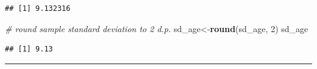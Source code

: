\documentclass[
]{article}
\newenvironment{Shaded}{\begin{snugshade}}{\end{snugshade}}
\newcommand{\CommentTok}[1]{\textcolor[rgb]{0.56,0.35,0.01}{\textit{#1}}}
\newcommand{\DecValTok}[1]{\textcolor[rgb]{0.00,0.00,0.81}{#1}}
\newcommand{\FunctionTok}[1]{\textcolor[rgb]{0.13,0.29,0.53}{\textbf{#1}}}
\newcommand{\NormalTok}[1]{#1}
\newcommand{\OtherTok}[1]{\textcolor[rgb]{0.56,0.35,0.01}{#1}}
\begin{document}
\begin{enumerate}
\begin{verbatim}
## [1] 9.132316
\end{verbatim}

\begin{Shaded}
\begin{Highlighting}[]
\CommentTok{\# round sample standard deviation to 2 d.p.}
\NormalTok{sd\_age}\OtherTok{\textless{}{-}}\FunctionTok{round}\NormalTok{(sd\_age, }\DecValTok{2}\NormalTok{)}
\NormalTok{sd\_age}
\end{Highlighting}
\end{Shaded}

\begin{verbatim}
## [1] 9.13
\end{verbatim}
\end{enumerate}

\begin{center}\rule{0.5\linewidth}{0.5pt}\end{center}
\end{document}
